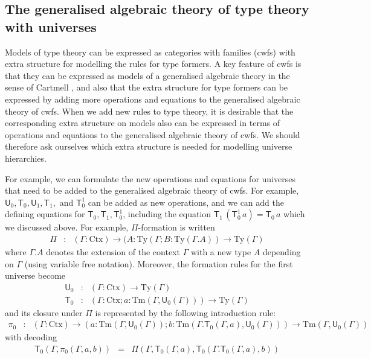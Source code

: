 \documentclass[11pt,a4paper]{article}
\def\UU{\mathsf{U}}
\newcommand{\T}{\mathsf{T}}
\def\Ctx{\mathrm{Ctx}}
\def\Ty{\mathrm{Ty}}
\def\Tm{\mathrm{Tm}}
\begin{document}

\subsection{The generalised algebraic theory of type theory with universes}

Models of type theory can be expressed as categories with families (cwfs) with extra structure for modelling the rules for type formers.  A key feature of cwfs is that they can be expressed as models of a generalised algebraic theory in the sense of Cartmell \cite{cartmell:apal}, and also that the extra structure for type formers can be expressed by adding more operations and equations to the generalised algebraic theory of cwfs. When we add new rules to type theory, it is desirable that the corresponding extra structure on  models also can be expressed in terms of operations and equations to the generalised algebraic theory of cwfs. We should therefore ask ourselves which extra structure is needed for modelling universe hierarchies.

For example, we can formulate the new operations and equations for universes that need to be added to the generalised algebraic theory of cwfs. For example, $\UU_0,\T_0,\UU_1, \T_1,$ and $\T_0^1$ can be added as new operations, and we can add the defining equations for $\T_0, \T_1,\T_0^1$, including the equation
$
\T_1\, (\T_0^1\, a) = \T_0\, a
$
which we discussed above.
For example, $\Pi$-formation is written 
\begin{eqnarray*}
\Pi&: &(\Gamma : \Ctx) \to (A : \Ty(\Gamma; B : \Ty(\Gamma.A)) \to\Ty(\Gamma)
\end{eqnarray*}
where $\Gamma.A$ denotes the extension of the context $\Gamma$ with a new type $A$ depending on $\Gamma$ (using variable free notation). Moreover, the formation rules for the first universe become
\begin{eqnarray*}
\UU_0 &: &(\Gamma : \Ctx) \to \Ty(\Gamma)\\
\T_0 &: &(\Gamma : \Ctx ; a : \Tm(\Gamma,\UU_0(\Gamma)))\to \Ty(\Gamma)
\end{eqnarray*}
and its closure under $\Pi$ is represented by the following introduction rule:
\begin{eqnarray*}
\pi_0&: &(\Gamma : \Ctx) \to (a : \Tm(\Gamma,\UU_0(\Gamma)); b : \Tm(\Gamma.\T_0(\Gamma,a),\UU_0(\Gamma))) \to\Tm(\Gamma,\UU_0(\Gamma))
\end{eqnarray*}
with decoding
\begin{eqnarray*}
\T_0(\Gamma,\pi_0(\Gamma,a,b)) &=& \Pi(\Gamma,\T_0(\Gamma,a), \T_0(\Gamma.\T_0(\Gamma,a),b))
\end{eqnarray*}
\end{document}
